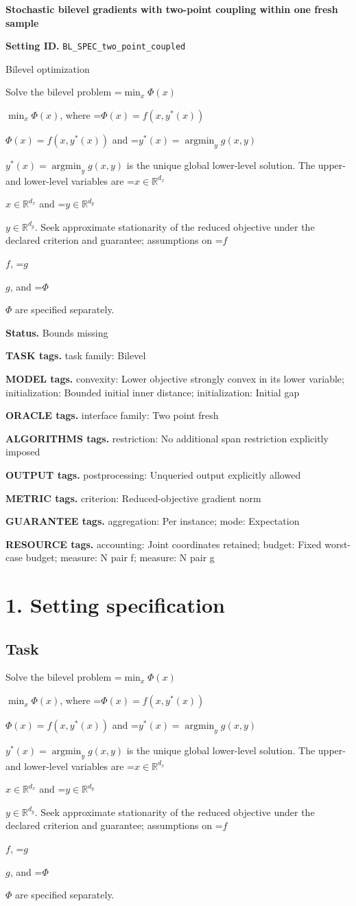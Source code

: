 \documentclass[10pt,a4paper]{article}
\newcommand{\AtlasMath}[1]{\par\begingroup\centering\setbox0=\hbox{$\displaystyle #1$}\ifdim\wd0>1.4\linewidth\typeout{ATLAS WIDE FORMULA: \the\wd0}\fi\ifdim\wd0>\linewidth\resizebox{\linewidth}{!}{\box0}\else\box0\fi\par\endgroup}
\newcommand{\AtlasInlineMath}[1]{\begingroup\setbox0=\hbox{$#1$}\ifdim\wd0>.4\linewidth\endgroup\AtlasMath{#1}\else\endgroup$#1$\fi}
\begin{document}
\raggedright

{\LARGE\bfseries\sffamily\color{AtlasNavy} Stochastic bilevel gradients with two-point coupling within one fresh sample\par}\vspace{5pt}
\textbf{Setting ID.} \texttt{BL\_\allowbreak{}SPEC\_\allowbreak{}two\_\allowbreak{}point\_\allowbreak{}coupled}

Bilevel optimization

Solve the bilevel problem \AtlasInlineMath{\min_x\Phi(x)}, where \AtlasInlineMath{\Phi(x)=f(x,y^*(x))} and \AtlasInlineMath{y^*(x)=\operatorname*{argmin}_y g(x,y)} is the unique global lower-level solution. The upper- and lower-level variables are \AtlasInlineMath{x\in\mathbb{R}^{d_x}} and \AtlasInlineMath{y\in\mathbb{R}^{d_y}}. Seek approximate stationarity of the reduced objective under the declared criterion and guarantee; assumptions on \AtlasInlineMath{f}, \AtlasInlineMath{g}, and \AtlasInlineMath{\Phi} are specified separately.

\textbf{Status.} Bounds missing

\textbf{TASK tags.} task family: Bilevel

\textbf{MODEL tags.} convexity: Lower objective strongly convex in its lower variable; initialization: Bounded initial inner distance; initialization: Initial gap

\textbf{ORACLE tags.} interface family: Two point fresh

\textbf{ALGORITHMS tags.} restriction: No additional span restriction explicitly imposed

\textbf{OUTPUT tags.} postprocessing: Unqueried output explicitly allowed

\textbf{METRIC tags.} criterion: Reduced-objective gradient norm

\textbf{GUARANTEE tags.} aggregation: Per instance; mode: Expectation

\textbf{RESOURCE tags.} accounting: Joint coordinates retained; budget: Fixed worst-case budget; measure: N pair f; measure: N pair g

\section{1. Setting specification}
\subsection{Task}
Solve the bilevel problem \AtlasInlineMath{\min_x\Phi(x)}, where \AtlasInlineMath{\Phi(x)=f(x,y^*(x))} and \AtlasInlineMath{y^*(x)=\operatorname*{argmin}_y g(x,y)} is the unique global lower-level solution. The upper- and lower-level variables are \AtlasInlineMath{x\in\mathbb{R}^{d_x}} and \AtlasInlineMath{y\in\mathbb{R}^{d_y}}. Seek approximate stationarity of the reduced objective under the declared criterion and guarantee; assumptions on \AtlasInlineMath{f}, \AtlasInlineMath{g}, and \AtlasInlineMath{\Phi} are specified separately.
\end{document}
